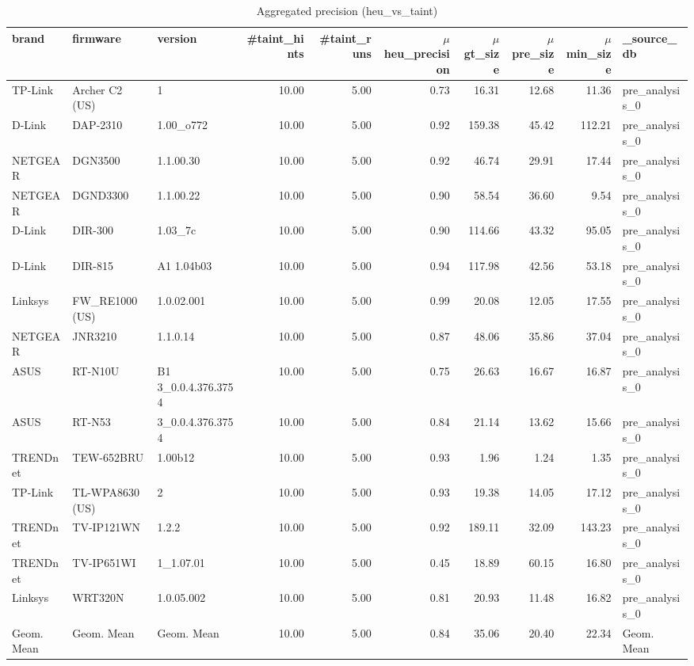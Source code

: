 \begin{table}[ht!]
\centering
\footnotesize
\begin{tabular}{| l | l | l | r | r | r | r | r | r | l |}
\hline
\textbf{brand} & \textbf{firmware} & \textbf{version} & \textbf{\#taint\_hints} & \textbf{\#taint\_runs} & \textbf{$\mu$heu\_precision} & \textbf{$\mu$gt\_size} & \textbf{$\mu$pre\_size} & \textbf{$\mu$min\_size} & \textbf{\_source\_db} \\
\hline
TP-Link & Archer C2 (US) & 1 & 10.00 & 5.00 & 0.73 & 16.31 & 12.68 & 11.36 & pre\_analysis\_0 \\
D-Link & DAP-2310 & 1.00\_o772 & 10.00 & 5.00 & 0.92 & 159.38 & 45.42 & 112.21 & pre\_analysis\_0 \\
NETGEAR & DGN3500 & 1.1.00.30 & 10.00 & 5.00 & 0.92 & 46.74 & 29.91 & 17.44 & pre\_analysis\_0 \\
NETGEAR & DGND3300 & 1.1.00.22 & 10.00 & 5.00 & 0.90 & 58.54 & 36.60 & 9.54 & pre\_analysis\_0 \\
D-Link & DIR-300 & 1.03\_7c & 10.00 & 5.00 & 0.90 & 114.66 & 43.32 & 95.05 & pre\_analysis\_0 \\
D-Link & DIR-815 & A1 1.04b03 & 10.00 & 5.00 & 0.94 & 117.98 & 42.56 & 53.18 & pre\_analysis\_0 \\
Linksys & FW\_RE1000 (US) & 1.0.02.001 & 10.00 & 5.00 & 0.99 & 20.08 & 12.05 & 17.55 & pre\_analysis\_0 \\
NETGEAR & JNR3210 & 1.1.0.14 & 10.00 & 5.00 & 0.87 & 48.06 & 35.86 & 37.04 & pre\_analysis\_0 \\
ASUS & RT-N10U & B1 3\_0.0.4.376.3754 & 10.00 & 5.00 & 0.75 & 26.63 & 16.67 & 16.87 & pre\_analysis\_0 \\
ASUS & RT-N53 & 3\_0.0.4.376.3754 & 10.00 & 5.00 & 0.84 & 21.14 & 13.62 & 15.66 & pre\_analysis\_0 \\
TRENDnet & TEW-652BRU & 1.00b12 & 10.00 & 5.00 & 0.93 & 1.96 & 1.24 & 1.35 & pre\_analysis\_0 \\
TP-Link & TL-WPA8630 (US) & 2 & 10.00 & 5.00 & 0.93 & 19.38 & 14.05 & 17.12 & pre\_analysis\_0 \\
TRENDnet & TV-IP121WN & 1.2.2 & 10.00 & 5.00 & 0.92 & 189.11 & 32.09 & 143.23 & pre\_analysis\_0 \\
TRENDnet & TV-IP651WI & 1\_1.07.01 & 10.00 & 5.00 & 0.45 & 18.89 & 60.15 & 16.80 & pre\_analysis\_0 \\
Linksys & WRT320N & 1.0.05.002 & 10.00 & 5.00 & 0.81 & 20.93 & 11.48 & 16.82 & pre\_analysis\_0 \\
\hline
Geom. Mean & Geom. Mean & Geom. Mean & 10.00 & 5.00 & 0.84 & 35.06 & 20.40 & 22.34 & Geom. Mean \\
\hline
\end{tabular}
\caption{Aggregated precision (heu\_vs\_taint)}
\label{tab:agg_results}
\end{table}